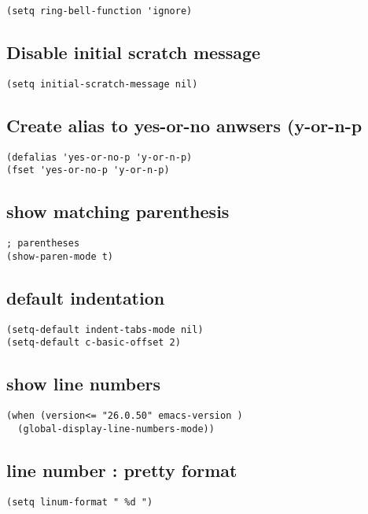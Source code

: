 \documentclass[11pt]{article}
\begin{document}
\begin{verbatim}
(setq ring-bell-function 'ignore)
\end{verbatim}

\subsection*{Disable initial scratch message}
\label{sec:org888e9b4}
\begin{verbatim}
(setq initial-scratch-message nil)
\end{verbatim}
\subsection*{Create alias to yes-or-no anwsers (y-or-n-p}
\label{sec:org4abf6c6}
\begin{verbatim}
(defalias 'yes-or-no-p 'y-or-n-p)
(fset 'yes-or-no-p 'y-or-n-p) 
\end{verbatim}


\subsection*{show matching parenthesis}
\label{sec:orgec9465d}
\begin{verbatim}
; parentheses
(show-paren-mode t)
\end{verbatim}

\subsection*{default indentation}
\label{sec:orgfb60ba4}
\begin{verbatim}
(setq-default indent-tabs-mode nil)
(setq-default c-basic-offset 2)
\end{verbatim}

\subsection*{show line numbers}
\label{sec:orgdc90f6c}
\begin{verbatim}
(when (version<= "26.0.50" emacs-version )
  (global-display-line-numbers-mode))
\end{verbatim}

\subsection*{line number : pretty format}
\label{sec:orge562435}
\begin{verbatim}
(setq linum-format " %d ")
\end{verbatim}
\end{document}
